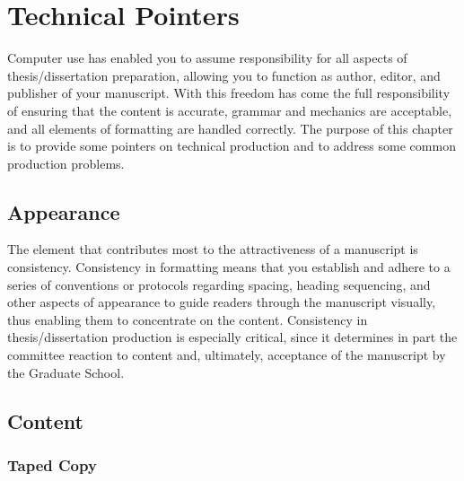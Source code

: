 \chapter{Technical Pointers}
\label{chap:TechnicalPointers}

Computer use has enabled you to assume responsibility for all aspects
of the\-sis/dis\-ser\-ta\-tion preparation, allowing you to function
as author, editor, and publisher of your manuscript. With this freedom
has come the full responsibility of ensuring that the content is
accurate, grammar and mechanics are acceptable, and all elements of
formatting are handled correctly. The purpose of this chapter is to
provide some pointers on technical production and to address some
common production problems.

\section{Appearance}
\label{sec:Appearance}

The element that contributes most to the attractiveness of a
manuscript is consistency. Consistency in formatting means that you
establish and adhere to a series of conventions or protocols regarding
spacing, heading sequencing, and other aspects of appearance to guide
readers through the manuscript visually, thus enabling them to
concentrate on the content. Consistency in the\-sis/dis\-ser\-ta\-tion
production is especially critical, since it determines in part the
committee reaction to content and, ultimately, acceptance of the
manuscript by the Graduate School.

\section{Content}
\label{sec:Content}

\subsection{Taped Copy}
\label{sec:TapedCopy}

